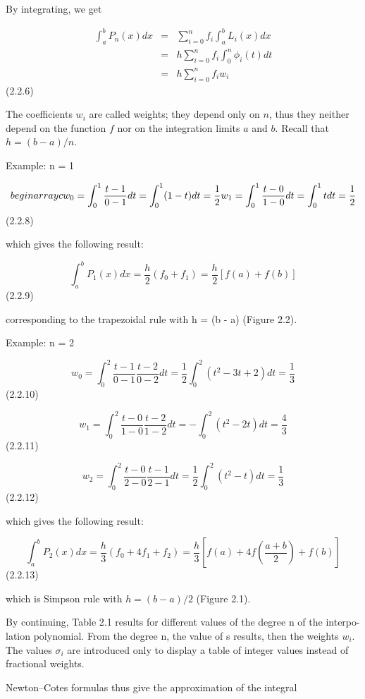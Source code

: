 \documentclass[letterpaper,12pt]{article}
\begin{document}
By integrating, we get

\[
\begin{array} {l|c|l} 
\int^b_a P_n(x)dx & = & \sum^n_{i=0} f_i \int^b_a L_i(x)dx \\ 
     & = & h \sum^n_{i=0} f_i \int^n_0 \phi_i(t) dt \\
     & = & h \sum^n_{i=0} f_i w_i
\end{array}
\]
(2.2.6)

The coefficients $w_i$ are called weights; they depend only on $n$, thus they neither depend
on the function $f$ nor on the integration limits $a$ and $b$. Recall that $h = (b - a)/n$.

Example: n = 1

$$
begin{array} {c}
w_0 = \int^1_0 \frac{t - 1}{0 - 1}dt = \int^1_0 (1-t) dt = \frac{1}{2} \\
w_1 = \int^1_0 \frac{t - 0}{1 - 0}dt = \int^1_0 t dt = \frac{1}{2}
$$
 (2.2.8)

which gives the following result:

$$
\int^b_a P_1(x)dx = \frac{h}{2} (f_0 + f_1) = \frac{h}{2} [ f (a) + f (b)]
$$
 (2.2.9)

corresponding to the trapezoidal rule with h = (b - a) (Figure 2.2).

Example: n = 2

$$
w_0 = \int^2_0 \frac{t - 1}{0 - 1} \frac{t - 2}{0 - 2} dt = \frac{1}{2} \int^2_0 (t^2 - 3t + 2)dt = \frac{1}{3}
$$
 (2.2.10)

$$
w_1 = \int^2_0 \frac{t - 0}{1 - 0} \frac{t - 2}{1 - 2} dt = - \int^2_0 (t^2 - 2t)dt = \frac{4}{3}
$$
 (2.2.11)

$$
w_2 = \int^2_0 \frac{t - 0}{2 - 0} \frac{t - 1}{2 - 1} dt = \frac{1}{2} \int^2_0 (t^2 - t) dt = \frac{1}{3}
$$
 (2.2.12)

which gives the following result:

$$
\int^b_a P_2(x)dx = \frac{h}{3} ( f_0 + 4 f_1 + f_2) = \frac{h}{3}[ f (a) + 4 f (\frac{a + b}{2} ) + f (b)]
$$
 (2.2.13)

which is Simpson rule with $h = (b - a)/2$ (Figure 2.1).

By continuing, Table 2.1 results for different values of the degree n of the interpo-
lation polynomial. From the degree n, the value of s results, then the weights $w_i$. The
values $\sigma_i$ are introduced only to display a table of integer values instead of fractional
weights.

Newton–Cotes formulas thus give the approximation of the integral
\end{document}
